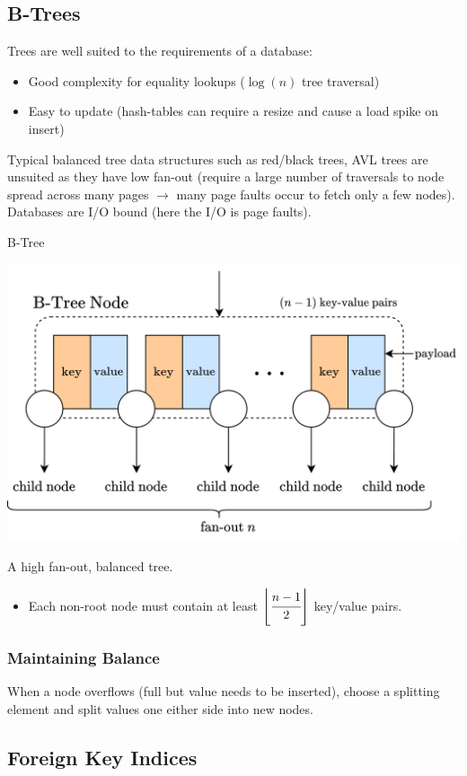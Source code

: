 \subsection{B-Trees}
Trees are well suited to the requirements of a database:
\begin{itemize}
    \item Good complexity for equality lookups ($\log(n)$ tree traversal)
    \item Easy to update (hash-tables can require a resize and cause a load spike on insert)
\end{itemize}
Typical balanced tree data structures such as red/black trees, AVL trees are unsuited as they have low fan-out (require a large number of traversals to node spread across many pages $\to$ many page faults occur to fetch only a few nodes). Databases are I/O bound (here the I/O is page faults).

\begin{definitionbox}{B-Tree}
    \begin{center}
        \includegraphics[width=.8\textwidth]{algorithms_and_indices/images/b_tree_node.drawio.png}
    \end{center}
    A high fan-out, balanced tree.
    \begin{itemize}
        \item Each non-root node must contain at least $\left\lfloor \cfrac{n-1}{2} \right\rfloor$ key/value pairs.
    \end{itemize}
\end{definitionbox}

\subsubsection{Maintaining Balance}
When a node overflows (full but value needs to be inserted), choose a splitting element and split values one either side into new nodes.
\unfinished

\subsection{Foreign Key Indices}
\unfinished
